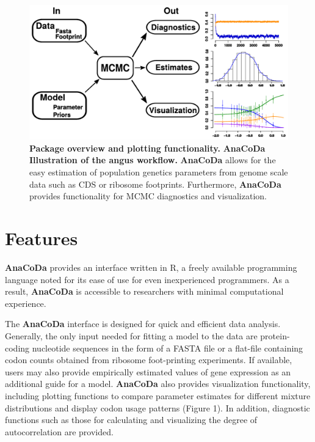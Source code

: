 \documentclass{bioinfo}
\newcommand{\package}{\textbf{AnaCoDa }} %
\begin{document}
\begin{figure}[!tpb]
\centering
 \includegraphics[width=5in]{workflow_croped.pdf}
\vspace{-0.2cm}
\caption{\textbf{Package overview and plotting functionality.} \package \textbf{Illustration of the angus workflow.} 
\package allows for the easy estimation of population genetics parameters from genome scale data such as CDS or ribosome footprints. 
Furthermore, \package provides functionality for MCMC diagnostics and visualization. 
}
\label{fig:plotbin}
\end{figure}

\section*{Features}
\package provides an interface written in R, a freely available programming language noted for its ease of use for even inexperienced programmers. 
As a result, \package is accessible to researchers with minimal computational experience. 

The \package interface is designed for quick and efficient data analysis.
Generally, the only input needed for fitting a model to the data are protein-coding nucleotide sequences in the form of a FASTA file or a flat-file containing codon counts obtained from ribosome foot-printing experiments. 
If available, users may also provide empirically estimated values of gene expression as an additional guide for a model.
\package also provides visualization functionality, including plotting functions to compare parameter estimates for different mixture distributions and display codon usage patterns (Figure 1). In addition, diagnostic functions such as those for calculating and visualizing the degree of autocorrelation are provided.
\end{document}
